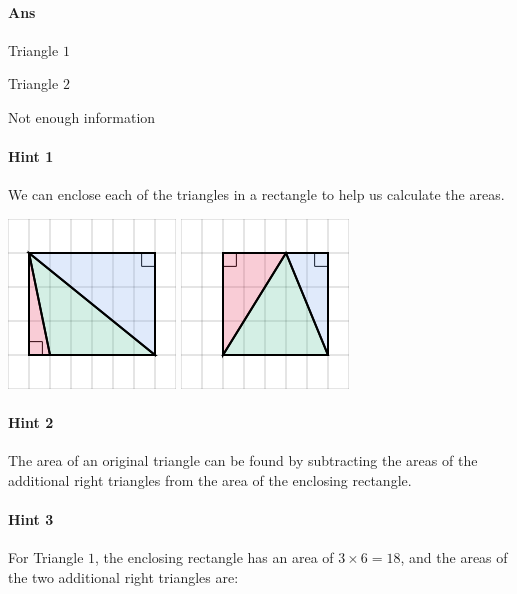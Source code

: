 \documentclass[twocolumn,10pt]{article}
\def\shrinkfactor{0.55}
\begin{document}
\paragraph{Ans} 

Triangle $1$

Triangle $2$


 Not enough information



\paragraph{Hint 1}We can enclose each of the triangles in a rectangle to help us calculate the areas.  

\includegraphics[scale=\shrinkfactor]{figures/654fe9a0a38e5306d6be147e41867389bd058f2d.png} 
\includegraphics[scale=\shrinkfactor]{figures/7384f2bca82e3eef65f9b516b08b392a0a3da559.png}

\paragraph{Hint 2}The area of an original triangle can be found by subtracting the areas of the additional right triangles from the area of the enclosing rectangle.  

\paragraph{Hint 3}For Triangle $1$, the enclosing rectangle has an area of $3 \times 6 = 18$, and the areas of the two additional right triangles are:  
\end{document}
